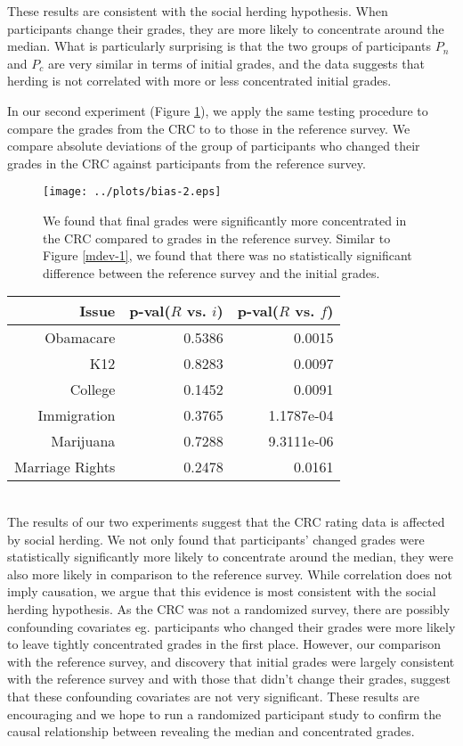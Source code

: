 These results are consistent with the social herding hypothesis.
When participants change their grades, they are more likely to concentrate around the median.
What is particularly surprising is that the two groups of participants $P_n$ and $P_c$ are very similar in terms of initial grades, and the data suggests that herding is not correlated with more or less concentrated initial grades.

In our second experiment (Figure \ref{mdev-2}), we apply the same testing procedure to compare the grades from the CRC to to those in the reference survey.
We compare absolute deviations of the group of participants who changed their grades in the CRC against participants from the reference survey.
\begin{figure}[h]
  \centering
    \texttt{[image: ../plots/bias-2.eps]}
      \caption{We found that final grades were significantly more concentrated in the CRC compared to grades in the reference survey. Similar to Figure \ref{mdev-1}, we found that there was no statistically significant difference between the reference survey and the initial grades.}
      \label{mdev-2}
\end{figure}

\begin{tabular}[!ht] { r | r | r }
\label{ref-1}
  Issue & p-val($R$ vs. $i$) & p-val($R$ vs. $f$) \\
  \hline
  \hline
  Obamacare &  0.5386 & 0.0015 \\
  \hline
  K12 & 0.8283 & 0.0097 \\
  \hline
  College & 0.1452 & 0.0091 \\
  \hline
  Immigration & 0.3765 & 1.1787e-04\\
  \hline
  Marijuana & 0.7288 & 9.3111e-06\\
  \hline
  Marriage Rights & 0.2478 & 0.0161 \\
\end{tabular}\\[1\baselineskip]

The results of our two experiments suggest that the CRC rating data is affected by social herding.
We not only found that participants' changed grades were statistically significantly more likely to concentrate around the median, they were also more likely in comparison to the reference survey.
While correlation does not imply causation, we argue that this evidence is most consistent with the social herding hypothesis.
As the CRC was not a randomized survey, there are possibly confounding covariates eg. participants who changed their grades were more likely to leave tightly concentrated grades in the first place.
However, our comparison with the reference survey, and discovery that initial grades were largely consistent with the reference survey and with those that didn't change their grades, suggest that these confounding covariates are not very significant.
These results are encouraging and we hope to run a randomized participant study to confirm the causal relationship between revealing the median and concentrated grades.

